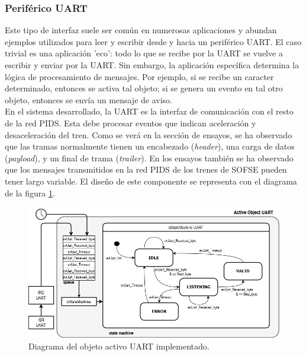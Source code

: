 
\subsubsection{Periférico UART}

 Este tipo de interfaz suele ser común en numerosas aplicaciones y abundan ejemplos utilizados para leer y escribir desde y hacia un periférico UART. El caso trivial es una aplicación 'eco': todo lo que se recibe por la UART se vuelve a escribir y enviar por la UART. Sin embargo, la aplicación específica determina la lógica de procesamiento de mensajes. Por ejemplo, si se recibe un caracter determinado, entonces se activa tal objeto; si se genera un evento en tal otro objeto, entonces se envía un mensaje de aviso. \\

En el sistema desarrollado, la UART es la interfaz de comunicación con el resto de la red PIDS. Esta debe procesar eventos que indican aceleración y desaceleración del tren. Como se verá en la sección de ensayos, se ha observado que las tramas normalmente tienen un encabezado (\textit{header}), una carga de datos (\textit{payload}), y un final de trama (\textit{trailer}). En los ensayos también se ha observado que los mensajes transmitidos en la red PIDS de los trenes de SOFSE pueden tener largo variable. El diseño de este componente se representa con el diagrama de la figura \ref{fig:diagfsmUART}.\\


\begin{figure}[ht]
	\centering
	\includegraphics[width=1\textwidth]{./Figures/fsmUART3.png}
	\caption{Diagrama del objeto activo UART implementado.}
	\label{fig:diagfsmUART}
\end{figure}

